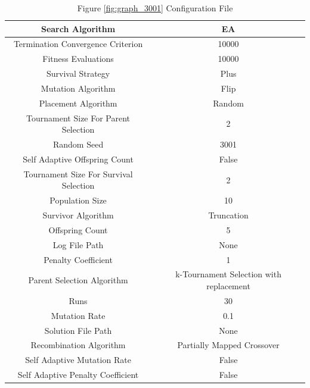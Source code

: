 \documentclass{standalone}
\begin{document}
\begin{table}[!htb]
	\centering
	\caption{Figure \ref{fig:graph_3001} Configuration File}
	\label{tab:graph_3001}
	\begin{tabular}{| c | c |}
		\hline
		Search Algorithm		& EA		 \\
		\hline
		Termination Convergence Criterion		& 10000		 \\
		\hline
		Fitness Evaluations		& 10000		 \\
		\hline
		Survival Strategy		& Plus		 \\
		\hline
		Mutation Algorithm		& Flip		 \\
		\hline
		Placement Algorithm		& Random		 \\
		\hline
		Tournament Size For Parent Selection		& 2		 \\
		\hline
		Random Seed		& 3001		 \\
		\hline
		Self Adaptive Offspring Count		& False		 \\
		\hline
		Tournament Size For Survival Selection		& 2		 \\
		\hline
		Population Size		& 10		 \\
		\hline
		Survivor Algorithm		& Truncation		 \\
		\hline
		Offspring Count		& 5		 \\
		\hline
		Log File Path		& None		 \\
		\hline
		Penalty Coefficient		& 1		 \\
		\hline
		Parent Selection Algorithm		& k-Tournament Selection with replacement		 \\
		\hline
		Runs		& 30		 \\
		\hline
		Mutation Rate		& 0.1		 \\
		\hline
		Solution File Path		& None		 \\
		\hline
		Recombination Algorithm		& Partially Mapped Crossover		 \\
		\hline
		Self Adaptive Mutation Rate		& False		 \\
		\hline
		Self Adaptive Penalty Coefficient		& False		 \\
		\hline
	\end{tabular}
\end{table}
\end{document}
